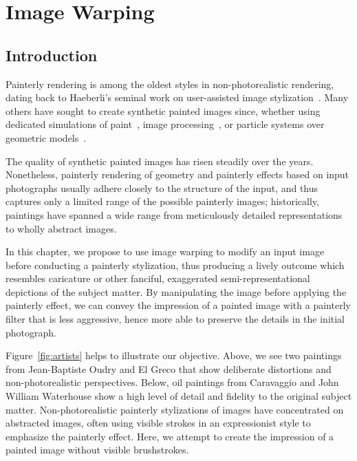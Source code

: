 \chapter{Image Warping}\label{chap:warping}
\section{Introduction}

Painterly rendering is among the oldest styles in non-photorealistic rendering,
dating back to Haeberli's seminal work on user-assisted image
stylization~\cite{Hae:stroke}. 
Many others have sought to create synthetic painted
images since, whether using dedicated simulations of paint~\cite{impasto},
 image processing~\cite{Bousseau:2007,Hertzmann:1998}, 
 or particle systems
over geometric models~\cite{meier}.



The quality of synthetic painted images has risen steadily over the years.
Nonetheless, painterly rendering of geometry and painterly effects based on
input photographs usually
adhere closely to the structure of the input,
and thus captures only a limited
range of the possible painterly images; historically, paintings have spanned a wide
range from meticulously detailed representations
to wholly abstract images.


In this chapter, we propose to use image warping to modify an input image before
conducting a painterly stylization, thus producing a lively outcome which
resembles caricature or other fanciful, exaggerated semi-representational
depictions of the subject matter. By manipulating the image before applying the
painterly effect, we can convey the impression of a painted image with a
painterly filter that is less aggressive, hence more able to preserve the
details in the initial photograph.

Figure~\ref{fig:artists} 
helps to illustrate our objective. Above, we see two paintings
from Jean-Baptiste Oudry and El Greco
that show deliberate distortions and non-photorealistic perspectives. Below,
oil paintings from Caravaggio and John William Waterhouse show a high level of detail and
fidelity to the original subject matter. Non-photorealistic painterly stylizations of
images have concentrated on abstracted images, often using visible strokes in
an expressionist style to emphasize the painterly effect. Here, we attempt to create
the impression of a painted image without visible brushstrokes.

